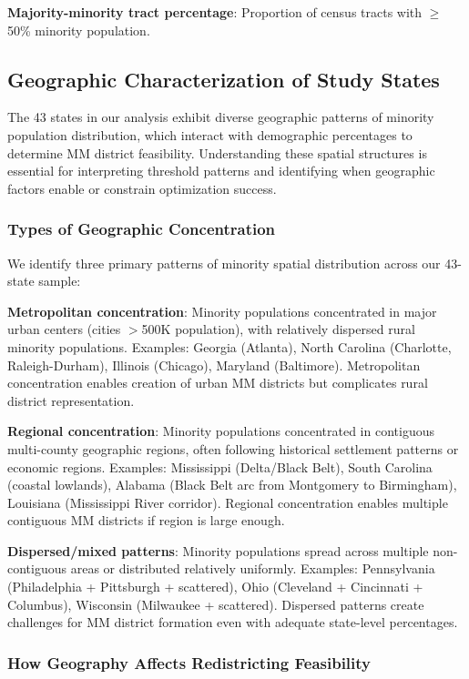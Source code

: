 \textbf{Majority-minority tract percentage}: Proportion of census tracts with $\geq$50\% minority population.

\subsection{Geographic Characterization of Study States}

The 43 states in our analysis exhibit diverse geographic patterns of minority population distribution, which interact with demographic percentages to determine MM district feasibility. Understanding these spatial structures is essential for interpreting threshold patterns and identifying when geographic factors enable or constrain optimization success.

\subsubsection{Types of Geographic Concentration}

We identify three primary patterns of minority spatial distribution across our 43-state sample:

\textbf{Metropolitan concentration}: Minority populations concentrated in major urban centers (cities $>$500K population), with relatively dispersed rural minority populations. Examples: Georgia (Atlanta), North Carolina (Charlotte, Raleigh-Durham), Illinois (Chicago), Maryland (Baltimore). Metropolitan concentration enables creation of urban MM districts but complicates rural district representation.

\textbf{Regional concentration}: Minority populations concentrated in contiguous multi-county geographic regions, often following historical settlement patterns or economic regions. Examples: Mississippi (Delta/Black Belt), South Carolina (coastal lowlands), Alabama (Black Belt arc from Montgomery to Birmingham), Louisiana (Mississippi River corridor). Regional concentration enables multiple contiguous MM districts if region is large enough.

\textbf{Dispersed/mixed patterns}: Minority populations spread across multiple non-contiguous areas or distributed relatively uniformly. Examples: Pennsylvania (Philadelphia + Pittsburgh + scattered), Ohio (Cleveland + Cincinnati + Columbus), Wisconsin (Milwaukee + scattered). Dispersed patterns create challenges for MM district formation even with adequate state-level percentages.

\subsubsection{How Geography Affects Redistricting Feasibility}

